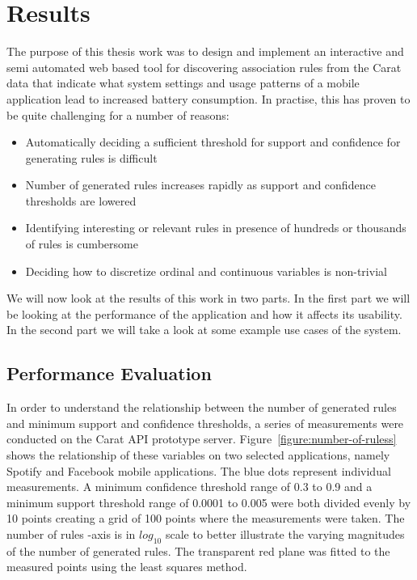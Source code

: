 \section{Results}

The purpose of this thesis work was to design and implement an interactive and semi automated web based tool for discovering association rules from the Carat data that indicate what system settings and usage patterns of a mobile application lead to increased battery consumption. In practise, this has proven to be quite challenging for a number of reasons:

\begin{itemize}
  \item Automatically deciding a sufficient threshold for support and confidence for generating rules is difficult 
  \item Number of generated rules increases rapidly as support and confidence thresholds are lowered
  \item Identifying interesting or relevant rules in presence of hundreds or thousands of rules is cumbersome
  \item Deciding how to discretize ordinal and continuous variables is non-trivial          
\end{itemize}

We will now look at the results of this work in two parts. In the first part we will be looking at the performance of the application and how it affects its usability. In the second part we will take a look at some example use cases of the system.  

\subsection{Performance Evaluation}

In order to understand the relationship between the number of generated rules and minimum support and confidence thresholds, a series of measurements were conducted on the Carat API prototype server. Figure~\ref{figure:number-of-ruless} shows the relationship of these variables on two selected applications, namely Spotify and Facebook mobile applications. The blue dots represent individual measurements. A minimum confidence threshold range of 0.3 to 0.9 and a minimum support threshold range of 0.0001 to 0.005 were both divided evenly by 10 points creating a grid of 100 points where the measurements were taken. The number of rules -axis is in $log_{10}$ scale to better illustrate the varying magnitudes of the number of generated rules. The transparent red plane was fitted to the measured points using the least squares method.


